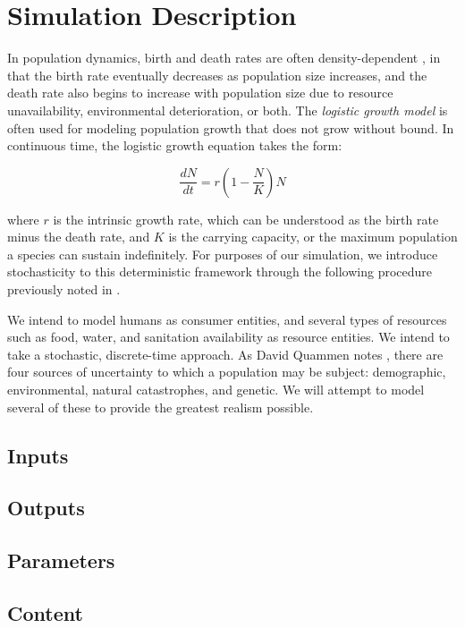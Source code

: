 \documentclass[12pt]{article}
\begin{document}
\section{Simulation Description}
\label{sec:simdescrip}

In population dynamics, birth and death rates are often density-dependent
\cite{guckenheimer1977dynamics}, in that the birth rate eventually decreases as
population size increases, and the death rate also begins to increase with
population size due to resource unavailability, environmental deterioration, or
both. The \textit{logistic growth model} is often used for modeling population
growth that does not grow without bound. In continuous time, the logistic growth
equation takes the form:

\begin{equation}
  \frac{dN}{dt} = r\left(1-\frac{N}{K}\right)N
\end{equation}

where $r$ is the intrinsic growth rate, which can be understood as the birth
rate minus the death rate, and $K$ is the carrying capacity, or the maximum
population a species can sustain indefinitely. For purposes of our simulation,
we introduce stochasticity to this deterministic framework through the following
procedure previously noted in \cite{fugotakasu}.


We intend to model humans as consumer entities, and several
types of resources such as food, water, and sanitation availability as resource
entities. We intend to take a stochastic, discrete-time approach. As David
Quammen notes \cite{quammen1996song}, there are four sources of uncertainty to
which a population may be subject: demographic, environmental, natural
catastrophes, and genetic. We will attempt to model several of these to
provide the greatest realism possible.

\subsection{Inputs}

\subsection{Outputs}
\subsection{Parameters}
\subsection{Content}
\end{document}

